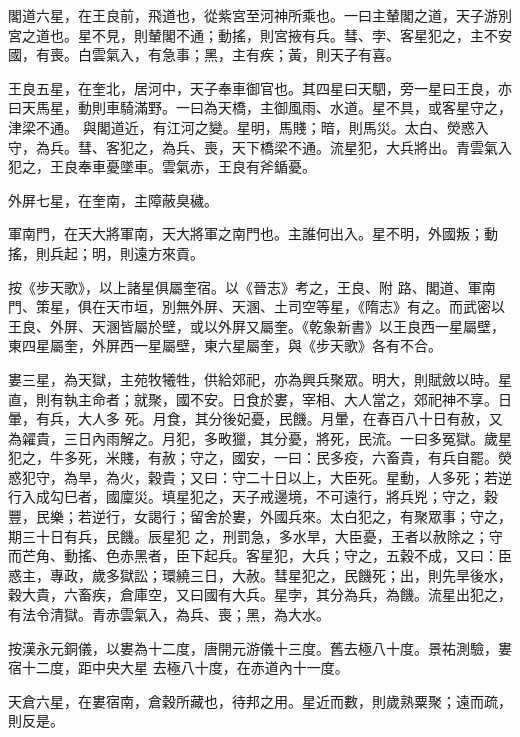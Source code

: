 \begin{pinyinscope}
 閣道六星，在王良前，飛道也，從紫宮至河神所乘也。一曰主輦閣之道，天子游別宮之道也。星不見，則輦閣不通；動搖，則宮掖有兵。彗、孛、客星犯之，主不安國，有喪。白雲氣入，有急事；黑，主有疾；黃，則天子有喜。



 王良五星，在奎北，居河中，天子奉車御官也。其四星曰天駟，旁一星曰王良，亦曰天馬星，動則車騎滿野。一曰為天橋，主御風雨、水道。星不具，或客星守之，津梁不通。
 與閣道近，有江河之變。星明，馬賤；暗，則馬災。太白、熒惑入守，為兵。彗、客犯之，為兵、喪，天下橋梁不通。流星犯，大兵將出。青雲氣入犯之，王良奉車憂墜車。雲氣赤，王良有斧鍎憂。



 外屏七星，在奎南，主障蔽臭穢。



 軍南門，在天大將軍南，天大將軍之南門也。主誰何出入。星不明，外國叛；動搖，則兵起；明，則遠方來貢。



 按《步天歌》，以上諸星俱屬奎宿。以《晉志》考之，王良、附
 路、閣道、軍南門、策星，俱在天市垣，別無外屏、天溷、土司空等星，《隋志》有之。而武密以王良、外屏、天溷皆屬於壁，或以外屏又屬奎。《乾象新書》以王良西一星屬壁，東四星屬奎，外屏西一星屬壁，東六星屬奎，與《步天歌》各有不合。



 婁三星，為天獄，主苑牧犧牲，供給郊祀，亦為興兵聚眾。明大，則賦斂以時。星直，則有執主命者；就聚，國不安。日食於婁，宰相、大人當之，郊祀神不享。日暈，有兵，大人多
 死。月食，其分後妃憂，民饑。月暈，在春百八十日有赦，又為糴貴，三日內雨解之。月犯，多畋獵，其分憂，將死，民流。一曰多冤獄。歲星犯之，牛多死，米賤，有赦；守之，國安，一曰：民多疫，六畜貴，有兵自罷。熒惑犯守，為旱，為火，穀貴；又曰：守二十日以上，大臣死。星動，人多死；若逆行入成勾巳者，國廩災。填星犯之，天子戒邊境，不可遠行，將兵兇；守之，穀豐，民樂；若逆行，女謁行；留舍於婁，外國兵來。太白犯之，有聚眾事；守之，期三十日有兵，民饑。辰星犯
 之，刑罰急，多水旱，大臣憂，王者以赦除之；守而芒角、動搖、色赤黑者，臣下起兵。客星犯，大兵；守之，五穀不成，又曰：臣惑主，專政，歲多獄訟；環繞三日，大赦。彗星犯之，民饑死；出，則先旱後水，穀大貴，六畜疾，倉庫空，又曰國有大兵。星孛，其分為兵，為饑。流星出犯之，有法令清獄。青赤雲氣入，為兵、喪；黑，為大水。



 按漢永元銅儀，以婁為十二度，唐開元游儀十三度。舊去極八十度。景祐測驗，婁宿十二度，距中央大星
 去極八十度，在赤道內十一度。



 天倉六星，在婁宿南，倉穀所藏也，待邦之用。星近而數，則歲熟粟聚；遠而疏，則反是。




\end{pinyinscope}
